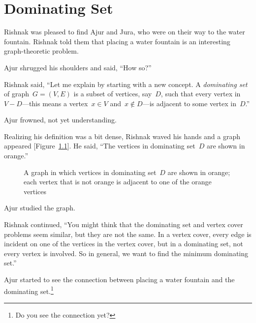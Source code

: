 \chapter{Dominating Set}

Rishnak was pleased to find Ajur and Jura, who were on their way to the water fountain. Rishnak told them that placing a water fountain is an interesting graph-theoretic problem.

Ajur shrugged his shoulders and said, ``How so?''

Rishnak said, ``Let me explain by starting with a new concept.  A \textit{dominating set} of graph~$G=(V,E)$ is a subset of vertices, say~$D$, such that every vertex in~$V-D$---this means a vertex~$x\in V$ and~$x\notin D$---is adjacent to some vertex in~$D$.''

Ajur frowned, not yet understanding.

Realizing his definition was a bit dense, Rishnak waved his hands and a graph appeared [Figure~\ref{18g1}]. He said, ``The vertices in dominating set~$D$ are shown in orange.''

\begin{figure}
\begin{center}
\caption{A graph in which vertices in dominating set~$D$ are shown in orange; each vertex that is not orange is adjacent to one of the orange vertices}\label{18g1}
\end{center}
\end{figure}

Ajur studied the graph.

Rishnak continued, ``You might think that the dominating set and vertex cover problems seem similar, but they are not the same. In a vertex cover, every edge is incident on one of the vertices in the vertex cover, but in a dominating set, not every vertex is involved.  So in general, we want to find the minimum dominating set.''

Ajur started to see the connection between placing a water fountain and the dominating set.\footnote{Do you see the connection yet?}

